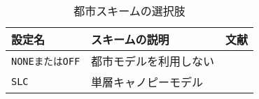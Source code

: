 \\

\begin{table}[h]
\begin{center}
  \caption{都市スキームの選択肢}
  \label{tab:nml_urban}
  \begin{tabularx}{150mm}{llX} \hline
    \rowcolor[gray]{0.9}  設定名 & スキームの説明 & 文献 \\ \hline
      \verb|NONEまたはOFF| & 都市モデルを利用しない                      \\
      \verb|SLC|          & 単層キャノピーモデル  & \citet{kusaka_2001} \\
    \hline
  \end{tabularx}
\end{center}
\end{table}

